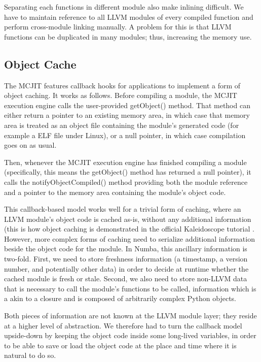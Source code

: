 \documentclass{acm_proc_article-sp}
\begin{document}
Separating each functions in different module also make inlining difficult.
We have to maintain reference to all LLVM modules of every compiled function
and perform cross-module linking manually. A problem for this is that
LLVM functions can be duplicated in many modules; thus, increasing the memory
use.


\subsection{Object Cache}

The MCJIT features callback hooks for
applications to implement a form of object caching.  It works as follows.
Before compiling a module, the MCJIT execution engine
calls the user-provided getObject() method.  That method can either
return a pointer to an existing memory area, in which case that
memory area is treated as an object file containing the module's
generated code (for example a ELF file under Linux), or a null pointer,
in which case compilation goes on as usual.

Then, whenever the MCJIT execution engine has finished compiling a
module (specifically, this means the getObject() method has returned
a null pointer), it calls the notifyObjectCompiled() method providing
both the module reference and a pointer to the memory area containing
the module's object code.

This callback-based model works well for a trivial form of caching,
where an LLVM module's object code is cached as-is, without any
additional information (this is how object caching is demonstrated in
the official Kaleidoscope tutorial \cite{llvmblog:kaleidoscope}.
However, more complex forms of
caching need to serialize additional information beside the object code
for the module.  In Numba, this ancillary information is two-fold.  First,
we need to store freshness information (a timestamp, a version number,
and potentially other data) in order to decide at runtime whether the
cached module is fresh or stale.  Second, we also need to store non-LLVM
data that is necessary to call the module's functions to be called,
information which is a akin to a closure and is composed of arbitrarily
complex Python objects.

Both pieces of information are not known at the LLVM module layer;
they reside at a higher level of abstraction.  We therefore had to
turn the callback model upside-down by keeping the object code inside
some long-lived variables, in order to be able to save or load
the object code at the place and time where it is natural to do so.
\end{document}
